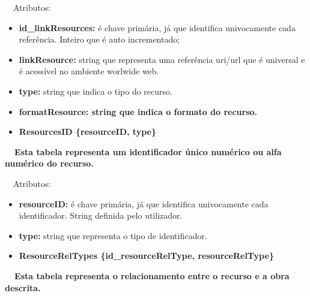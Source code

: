 \documentclass[letterpaper]{article}
\newcommand\textstyleStrongEmphasis[1]{\textbf{#1}}
\newcommand\liststyleLi{%
\renewcommand\labelitemi{{\textbullet}}
\renewcommand\labelitemii{[27A2?]}
\renewcommand\labelitemiii{{\textbullet}}
\renewcommand\labelitemiv{{\textbullet}}
}
\newcommand\liststyleLvi{%
\renewcommand\labelitemi{[27A2?]}
\renewcommand\labelitemii{[27A2?]}
\renewcommand\labelitemiii{[27A2?]}
\renewcommand\labelitemiv{[27A2?]}
}
\begin{document}
\bigskip

{
\ \ Atributos:}

\liststyleLvi
\begin{itemize}
\item {
\textbf{id\_linkResources}\textbf{:} \'e chave prim\'aria, j\'a que
identifica univocamente cada refer\^encia. Inteiro que \'e auto
incrementado;}
\item {
\textbf{linkResource:} string que representa uma refer\^encia uri/url
que \'e universal e \'e acess\'ivel no ambiente worlwide web.}
\item {
\textbf{type:} string que indica o tipo do recurso.}
\item {\bfseries
formatResource:\textmd{ string que indica o formato do recurso.}}
\end{itemize}

\bigskip

\liststyleLi
\begin{itemize}
\item {\bfseries
ResourcesID\textmd{ \{}\textmd{resourceID}\textmd{, type\}}}
\end{itemize}
{\bfseries
\foreignlanguage{english}{\textmd{\ \ Esta
}}\textstyleStrongEmphasis{\foreignlanguage{english}{\textmd{tabela}}}\foreignlanguage{english}{\textmd{
representa um identificador \'unico num\'erico ou alfa num\'erico do
recurso}}\foreignlanguage{english}{\textmd{.}}}


\bigskip

{
\ \ Atributos:}

\liststyleLvi
\begin{itemize}
\item {
\textbf{resourceID}\textbf{:} \'e chave prim\'aria, j\'a que identifica
univocamente cada identificador. String definida pelo utilizador.}
\item {
\textbf{type:} string que representa o tipo de identificador.}
\end{itemize}

\bigskip

\liststyleLi
\begin{itemize}
\item {\bfseries
ResourceRelTypes\textmd{ \{}\textmd{id\_resourceRelType}\textmd{,
resourceRelType\}}}
\end{itemize}
{\bfseries
\foreignlanguage{english}{\textmd{\ \ Esta
}}\textstyleStrongEmphasis{\foreignlanguage{english}{\textmd{tabela}}}\foreignlanguage{english}{\textmd{
representa o relacionamento entre o recurso e a obra
descrita}}\foreignlanguage{english}{\textmd{.}}}
\end{document}
